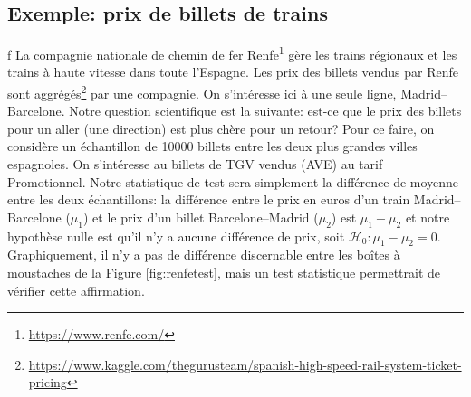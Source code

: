 \documentclass[
  11pt,
  letterpaper,
]{book}
\renewcommand{\href}[2]{#2\footnote{\url{#1}}}
\begin{document}
\hypertarget{exemple-prix-de-billets-de-trains}{%
\subsection{Exemple: prix de billets de trains}\label{exemple-prix-de-billets-de-trains}}

f
La compagnie nationale de chemin de fer \href{https://www.renfe.com/}{Renfe} gère les trains régionaux et les trains à haute vitesse dans toute l'Espagne. Les prix des billets vendus par Renfe sont \href{https://www.kaggle.com/thegurusteam/spanish-high-speed-rail-system-ticket-pricing}{aggrégés} par une compagnie. On s'intéresse ici à une seule ligne, Madrid--Barcelone. Notre question scientifique est la suivante: est-ce que le prix des billets pour un aller (une direction) est plus chère pour un retour? Pour ce faire, on considère un échantillon de 10000 billets entre les deux plus grandes villes espagnoles. On s'intéresse au billets de TGV vendus (AVE) au tarif Promotionnel. Notre statistique de test sera simplement la différence de moyenne entre les deux échantillons: la différence entre le prix en euros d'un train Madrid--Barcelone (\(\mu_1\)) et le prix d'un billet Barcelone--Madrid (\(\mu_2\)) est \(\mu_1-\mu_2\) et notre hypothèse nulle est qu'il n'y a aucune différence de prix, soit \(\mathscr{H}_0: \mu_1-\mu_2=0\). Graphiquement, il n'y a pas de différence discernable entre les boîtes à moustaches de la Figure \ref{fig:renfetest}, mais un test statistique permettrait de vérifier cette affirmation.
\end{document}
